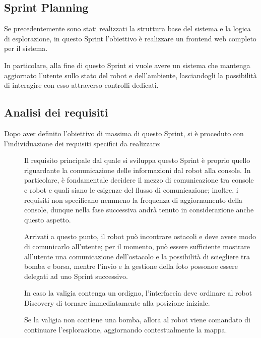 \subsection{Sprint Planning}

Se precedentemente sono stati realizzati la struttura base del sistema e la logica di esplorazione,
in questo Sprint l'obiettivo è realizzare un frontend web completo per il sistema.

In particolare, alla fine di questo Sprint si vuole avere un sistema che mantenga aggiornato l'utente sullo stato del robot e dell'ambiente,
lasciandogli la possibilità di interagire con esso attraverso controlli dedicati.

\subsection{Analisi dei requisiti}

Dopo aver definito l'obiettivo di massima di questo Sprint, si è proceduto con l'individuazione dei requisiti specifici da realizzare:

\begin{description}
  \item[]
    Il requisito principale dal quale si sviluppa questo Sprint è proprio quello riguardante la comunicazione delle informazioni dal robot alla console.
    In particolare, è fondamentale decidere il mezzo di comunicazione tra console e robot e quali siano le esigenze del flusso di comunicazione;
    inoltre, i requisiti non specificano nemmeno la frequenza di aggiornamento della console, dunque nella fase successiva andrà tenuto in considerazione anche questo aspetto.

  \item[]
    Arrivati a questo punto, il robot può incontrare ostacoli e deve avere modo di comunicarlo all'utente;
    per il momento, può essere sufficiente mostrare all'utente una comunicazione dell'ostacolo e la possibilità di sciegliere tra bomba e borsa,
    mentre l'invio e la gestione della foto possonoe essere delegati ad uno Sprint successivo.

  \item[]
    In caso la valigia contenga un ordigno, l'interfaccia deve ordinare al robot Discovery di tornare immediatamente alla posizione iniziale.

  \item[]
    Se la valigia non contiene una bomba, allora al robot viene comandato di continuare l'esplorazione, aggiornando contestualmente la mappa.
\end{description}

